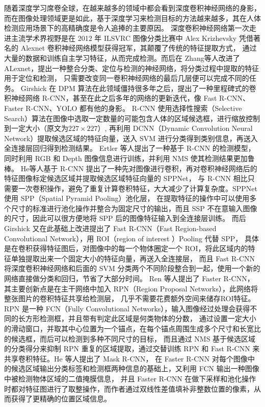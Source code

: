 随着深度学习席卷全球，在越来越多的领域中都会看到深度卷积神经网络的身影，而在图像处理领域更是如此，基于深度学习来检测目标的方法越来越多，其在人体检测应用场景下的高精确度是令人追捧的主要原因。
深度卷积神经网络第一次走进主流学术界视野是在 2012 年 ILSVRC 图像分类比赛中 Alex Krizhevsky 凭借著名的 Alexnet 卷积神经网络模型\cite{29}获得冠军，其颠覆了传统的特征提取方式，
通过大量的数据和训练自主学习特征，从而完成检测。而后在 Zhang等人\cite{30}改进了 ALexnet，提出一种整合分类、定位与检测的神经网络，将分类过程中提取的特征用于定位和检测，
只需要改变同一卷积神经网络的最后几层便可以完成不同的任务。
Girshick 在 DPM 算法在此领域僵持很多年之后，提出了一种里程碑式的卷积神经网络 R-CNN\cite{31}，甚至在此之后多年的网络的更新迭代，像 Fast R-CNN、Faster R-CNN、YOLO 都有他的身影。
R-CNN 使用选择性搜索（Selective Search）算法在图像中选取一定数量的可能包含人体的区域候选框，进行缩放控制到一定大小（原文为$227\times 227$）,
再利用 DCNN（Dynamic Convolution Neural Network）提取候选区域的特征向量，送入 SVM 进行分类得到类别信息，再送入全连接层回归得到检测结果。
Ertler 等人\cite{32}提出了一种基于 R-CNN 的检测模型，同时利用 RGB 和 Depth 图像信息进行训练，并利用 NMS 使其检测结果更加鲁棒。
He等人\cite{33}基于 R-CNN 提出了一种先对图像进行卷积，再对卷积神经网络后的特征图像标定候选区域并提取候选区域特征向量的 SPPNet，
与 R-CNN 相比只需要一次卷积操作，避免了重复计算卷积特征，大大减少了计算复杂度。SPPNet 使用 SPP（Spatial Pyramid Pooling）池化层，
在提取特征的操作中可以使用多个尺寸的标准进行池化操作并整合为固定尺寸的输出，而且 SSP 不在意输入图像的尺寸，因此可以很方便地将 SPP 后的图像特征输入到全连接层训练。
而后Girshick \cite{34}又在此基础上改进提出了 Fast R-CNN（Fast Region-based Convolutional Network），用 ROI（region of interest ）Pooling 代替 SPP，
具体是在卷积获得特征图后，对图像中的每一个物体圈定一个 ROI，将此区域内的特征单独提取出来一个固定大小的特征向量，再送入全连接层，
而且 Fast R-CNN 将深度卷积神经网络和后面的 SVM 分类两个不同阶段整合到一起，使用一个新的网络直接做分类和回归，节省了大部分时间。
Ren 等人\cite{35}提出了 Faster R-CNN，其主要创新点是在主干网络中加入 RPN（Region Proposal Networks），此网络将整张图片的卷积特征共享给检测层，
几乎不需要花费额外空间来储存ROI特征。RPN 是一种 FCN（Fully Convolutional Networks），输入图像经过处理会获得不同的长方形检测框，并且带有判定此区域是何类物体的分数，
通过设置一定大小的滑动窗口，并取其中心位置为一个锚点，在每个锚点周围生成多个尺寸和长宽比的候选框，而后可以检测到多种不同尺寸的目标，
而且通过 NMS 基于候选区域的分类得分来抑制 RPN 重复的区域提取，通过交替训练 RPN 和 Fast R-CNN 来共享卷积特征。He 等人\cite{36}提出了 Mask R-CNN，
在 Faster R-CNN 对每个图像中的候选区域输出分类标签和检测框两种信息的基础上，又利用 FCN 输出一种图像中被检测物体区域的二值掩膜信息，
并且 Faster R-CNN 在做下采样和池化操作时都对特征图进行了取整操作，而作者通过双线性差值填补非整数位置的像素，从而获得了更精确的位置区域信息。


